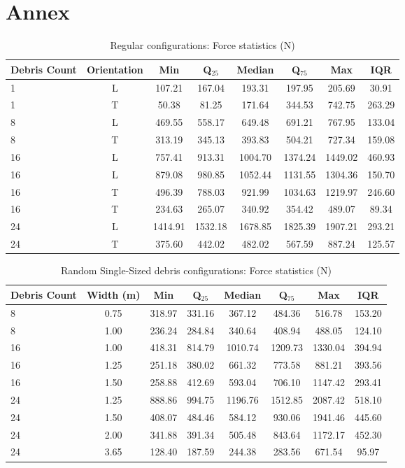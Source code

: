 \documentclass{article}
\begin{document}
\section{Annex}
\begin{table}[h!]
\centering
\caption{Regular configurations: Force statistics (N)}
\begin{tabular}{lccccccc}
\toprule
\textbf{Debris Count} & \textbf{Orientation} & \textbf{Min} & \textbf{Q$_{25}$} & \textbf{Median} & \textbf{Q$_{75}$} & \textbf{Max} & \textbf{IQR} \\
\midrule
1 & L & 107.21 & 167.04 & 193.31 & 197.95 & 205.69 & 30.91 \\
1 & T & 50.38 & 81.25 & 171.64 & 344.53 & 742.75 & 263.29 \\
8 & L & 469.55 & 558.17 & 649.48 & 691.21 & 767.95 & 133.04 \\
8 & T & 313.19 & 345.13 & 393.83 & 504.21 & 727.34 & 159.08 \\
16 & L & 757.41 & 913.31 & 1004.70 & 1374.24 & 1449.02 & 460.93 \\
16 & L & 879.08 & 980.85 & 1052.44 & 1131.55 & 1304.36 & 150.70 \\
16 & T & 496.39 & 788.03 & 921.99 & 1034.63 & 1219.97 & 246.60 \\
16 & T & 234.63 & 265.07 & 340.92 & 354.42 & 489.07 & 89.34 \\
24 & L & 1414.91 & 1532.18 & 1678.85 & 1825.39 & 1907.21 & 293.21 \\
24 & T & 375.60 & 442.02 & 482.02 & 567.59 & 887.24 & 125.57 \\
\bottomrule
\end{tabular}
\end{table}

\begin{table}[h!]
\centering
\caption{Random Single-Sized debris configurations: Force statistics (N)}
\begin{tabular}{lccccccc}
\toprule
\textbf{Debris Count} & \textbf{Width (m)} & \textbf{Min} & \textbf{Q$_{25}$} & \textbf{Median} & \textbf{Q$_{75}$} & \textbf{Max} & \textbf{IQR} \\
\midrule
8 & 0.75 & 318.97 & 331.16 & 367.12 & 484.36 & 516.78 & 153.20 \\
8 & 1.00 & 236.24 & 284.84 & 340.64 & 408.94 & 488.05 & 124.10 \\
16 & 1.00 & 418.31 & 814.79 & 1010.74 & 1209.73 & 1330.04 & 394.94 \\
16 & 1.25 & 251.18 & 380.02 & 661.32 & 773.58 & 881.21 & 393.56 \\
16 & 1.50 & 258.88 & 412.69 & 593.04 & 706.10 & 1147.42 & 293.41 \\
24 & 1.25 & 888.86 & 994.75 & 1196.76 & 1512.85 & 2087.42 & 518.10 \\
24 & 1.50 & 408.07 & 484.46 & 584.12 & 930.06 & 1941.46 & 445.60 \\
24 & 2.00 & 341.88 & 391.34 & 505.48 & 843.64 & 1172.17 & 452.30 \\
24 & 3.65 & 128.40 & 187.59 & 244.38 & 283.56 & 671.54 & 95.97 \\
\bottomrule
\end{tabular}
\end{table}
\end{document}
